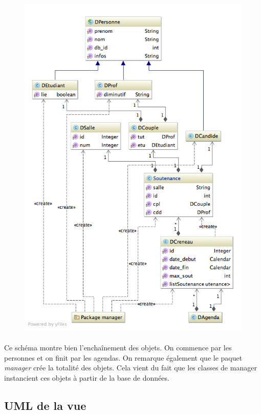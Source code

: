 \documentclass[a4paper,10pt]{report}
\begin{document}
			\begin{figure}[h!]
				\includegraphics[scale=.5]{uml_don.png}	
				\centering
			\end{figure}

			\paragraph*{}
			Ce schéma montre bien l’enchaînement des objets. On commence par les personnes et on finit par les agendas. On remarque également que le paquet \textit{manager} crée la totalité des objets. Cela vient du fait que les classes de manager instancient ces objets à partir de la base de données.

		\subsection{UML de la vue}
\end{document}
